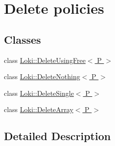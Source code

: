 \hypertarget{group__StrongPointerDeleteGroup}{}\section{Delete policies}
\label{group__StrongPointerDeleteGroup}
\subsection*{Classes}
\begin{DoxyCompactItemize}
\item 
class \hyperlink{classLoki_1_1DeleteUsingFree}{Loki\+::\+Delete\+Using\+Free$<$ P $>$}
\item 
class \hyperlink{classLoki_1_1DeleteNothing}{Loki\+::\+Delete\+Nothing$<$ P $>$}
\item 
class \hyperlink{classLoki_1_1DeleteSingle}{Loki\+::\+Delete\+Single$<$ P $>$}
\item 
class \hyperlink{classLoki_1_1DeleteArray}{Loki\+::\+Delete\+Array$<$ P $>$}
\end{DoxyCompactItemize}


\subsection{Detailed Description}
